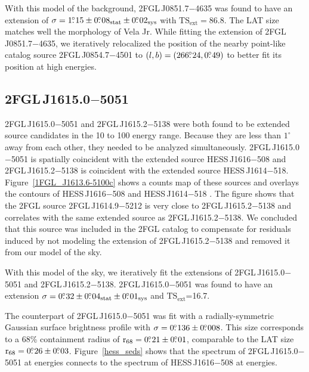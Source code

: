 \documentclass[12pt,preprint]{aastex}
\newcommand{\gev}{\text{GeV}\xspace}
\newcommand{\tev}{\text{TeV}\xspace}
\newcommand{\tsext}{{\ensuremath{\text{TS}_{\text{ext}}}}\xspace}
\newcommand{\rsixeight}{{\ensuremath{\text{r}_{68}}}\xspace}
\newcommand{\sys}{\text{sys}\xspace}
\newcommand{\stat}{\text{stat}\xspace}
\newcommand{\degree}{^\circ\xspace}
\begin{document}
With this model of the background, 2FGL\,J0851.7$-$4635 was found to
have an extension of $\sigma=1\fdg15\pm0\fdg08_\stat\pm0\fdg02_\sys$ with
$\tsext=86.8$.  The LAT size matches
well the \tev morphology of Vela Jr.  While fitting the extension
of 2FGL\,J0851.7$-$4635, we iteratively relocalized the position
of the nearby point-like catalog source 2FGL\,J0854.7$-$4501 to
$(l,b)=(266\mbox{$.\!\!^\circ$}24,0\mbox{$.\!\!^\circ$}49)$ to better fit its position at high energies.


\subsection{2FGL\,J1615.0$-$5051}
\label{section_2FGL_J1615.0-5051}


2FGL\,J1615.0$-$5051 and 2FGL\,J1615.2$-$5138 were both found to be
extended source candidates in the 10 \gev to 100 \gev energy range. Because
they are less than $1\degree$ away from each other, they needed to be analyzed
simultaneously.  2FGL\,J1615.0$-$5051 is spatially coincident with
the extended \tev source HESS\,J1616$-$508 and 2FGL\,J1615.2$-$5138
is coincident with the extended \tev source HESS\,J1614$-$518.
Figure~\ref{1FGL_J1613.6-5100c} shows a counts map of these sources and
overlays the \tev contours of HESS\,J1616$-$508 and HESS\,J1614$-$518
\citep{hess_plane_survey}.  The figure shows that the 2FGL source
2FGL\,J1614.9$-$5212 is very close to 2FGL\,J1615.2$-$5138 and correlates
with the same extended \tev source as 2FGL\,J1615.2$-$5138.  We concluded
that this source was included in the 2FGL catalog to compensate for residuals induced
by not modeling the extension of 2FGL\,J1615.2$-$5138 and removed
it from our model of the sky.  

With this model of the sky, we iteratively fit the extensions of
2FGL\,J1615.0$-$5051 and 2FGL\,J1615.2$-$5138.
2FGL\,J1615.0$-$5051 was found to have an extension 
$\sigma=0\fdg32\pm0\fdg04_\stat\pm0\fdg01_\sys$ and
\tsext=16.7.


The \tev counterpart of 2FGL\,J1615.0$-$5051 was fit
with a radially-symmetric Gaussian surface brightness profile with
$\sigma=0\mbox{$.\!\!^\circ$}136\pm0\mbox{$.\!\!^\circ$}008$.  This \tev size corresponds to a 68\%
containment radius of $\rsixeight=0\fdg21\pm0\fdg01$, comparable to the
LAT size $\rsixeight=0\fdg26\pm0\fdg03$.  Figure~\ref{hess_seds} shows
that the spectrum of 2FGL\,J1615.0$-$5051 at \gev energies connects to
the spectrum of HESS\,J1616$-$508 at \tev energies.
\end{document}
